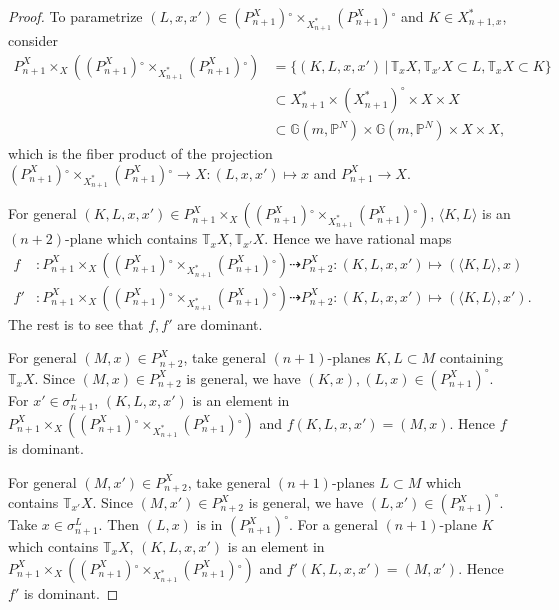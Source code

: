 \documentclass[a4paper,12pt]{amsart}
\theoremstyle{plain}
\theoremstyle{definition}
\begin{document}
\begin{proof}
  To parametrize $(L, x,x') \in {(P_{n+1}^X){^\circ} \times_{X_{n+1}^*} (P_{n+1}^X){^\circ}}$ and $K \in  X_{n+1,x}^* $,
  consider
  \begin{align*}
    P^X_{n+1} \times_X ({(P_{n+1}^X){^\circ} \times_{X_{n+1}^*} (P_{n+1}^X){^\circ}}) &= \{ (K,L,x,x') \, | \, {\mathbb {T}}_x X , {\mathbb {T}}_{x'} X \subset L , {\mathbb {T}}_x X \subset K\} \\  
    &\subset X_{n+1}^* \times (X_{n+1}^*)^{\circ} \times X \times X\\
    &\subset {\mathbb {G}}(m,{\mathbb{P}}^N) \times {\mathbb {G}}(m,{\mathbb{P}}^N) \times X \times X,
  \end{align*}
  which is the fiber product of
  the projection $  {(P_{n+1}^X){^\circ} \times_{X_{n+1}^*} (P_{n+1}^X){^\circ}} {\rightarrow} X : (L, x,x') \mapsto x $  and $ P^X_{n+1} {\rightarrow} X$.

  For general $(K,L, x,x') \in    P^X_{n+1} \times_X ({(P_{n+1}^X){^\circ} \times_{X_{n+1}^*} (P_{n+1}^X){^\circ}})$,
  $\langle K,L \rangle$ is an $(n+2)$-plane which contains ${\mathbb {T}}_x X, {\mathbb {T}}_{x'} X$.
  Hence we have rational maps
  \begin{align*}
    f  &:    P^X_{n+1} \times_X ({(P_{n+1}^X){^\circ} \times_{X_{n+1}^*} (P_{n+1}^X){^\circ}}) \dashrightarrow P_{n+2}^X : (K, L, x,x') \mapsto (\langle K,L \rangle, x) \\
    f' &:  P^X_{n+1} \times_X ({(P_{n+1}^X){^\circ} \times_{X_{n+1}^*} (P_{n+1}^X){^\circ}}) \dashrightarrow P_{n+2}^X : (K, L, x,x') \mapsto (\langle K,L \rangle, x').
  \end{align*}
  The rest is to see that $f,f'$ are dominant.

  For general $(M,x) \in P_{n+2}^X$,
  take general $(n+1)$-planes $K,L \subset M$ containing ${\mathbb {T}}_x X$.
  Since $(M,x) \in P_{n+2}^X$ is general, we have $(K,x), (L,x) \in (P_{n+1}^X)^{\circ}$.
  For $x' \in \sigma_{n+1}^L$,
  $(K,L,x,x')$ is an element in $P^X_{n+1} \times_X ({(P_{n+1}^X){^\circ} \times_{X_{n+1}^*} (P_{n+1}^X){^\circ}})$ and $f(K,L,x,x') = (M,x)$.
  Hence $f$ is dominant.

  For general $(M,x') \in P_{n+2}^X$,
  take general $(n+1)$-planes $L \subset M$ which contains ${\mathbb {T}}_{x'} X$.
  Since $(M,x') \in P_{n+2}^X$ is general, we have $(L,x') \in (P_{n+1}^X)^{\circ}$.
  Take $x \in \sigma_{n+1}^L$.
  Then $(L,x) $ is in $ (P_{n+1}^X)^{\circ}$.
  For a general $(n+1)$-plane $K $ which contains ${\mathbb {T}}_x X$,
  $(K,L,x,x')$ is an element in $  P^X_{n+1} \times_X ({(P_{n+1}^X){^\circ} \times_{X_{n+1}^*} (P_{n+1}^X){^\circ}})$ and $f' (K,L,x,x') = (M,x')$.
  Hence $f'$ is dominant.
\end{proof}
\end{document}
